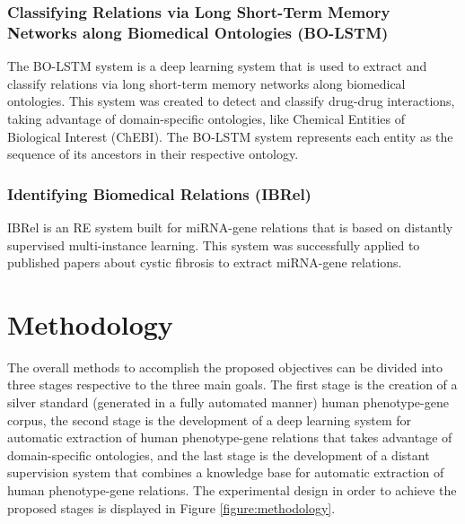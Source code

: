 \documentclass[11pt]{article}
\begin{document}
\subsubsection{Classifying Relations via Long Short-Term Memory Networks along Biomedical Ontologies (BO-LSTM)}

The BO-LSTM system \cite{BOLSTM} is a deep learning system that is used to extract and classify relations via long short-term memory networks along biomedical ontologies. This system was created to detect and classify drug-drug interactions, taking advantage of domain-specific ontologies, like Chemical Entities of Biological Interest (ChEBI). The BO-LSTM system represents each entity as the sequence of its ancestors in their respective ontology.


\subsubsection{Identifying Biomedical Relations (IBRel)}

IBRel is an RE system \cite{10.1371/journal.pone.0171929} built for miRNA-gene relations that is based on distantly supervised multi-instance learning. This system was successfully applied to published papers about cystic fibrosis to extract miRNA-gene relations.


\section{Methodology}

The overall methods to accomplish the proposed objectives can be divided into three stages respective to the three main goals. The first stage is the creation of a silver standard  (generated in a fully automated manner) human phenotype-gene corpus, the second stage is the development of a deep learning system for automatic extraction of human phenotype-gene relations that takes advantage of domain-specific ontologies, and the last stage is the development of a distant supervision system that combines a knowledge base for automatic extraction of human phenotype-gene relations. The experimental design in order to achieve the proposed stages is displayed in Figure \ref{figure:methodology}.
\end{document}
